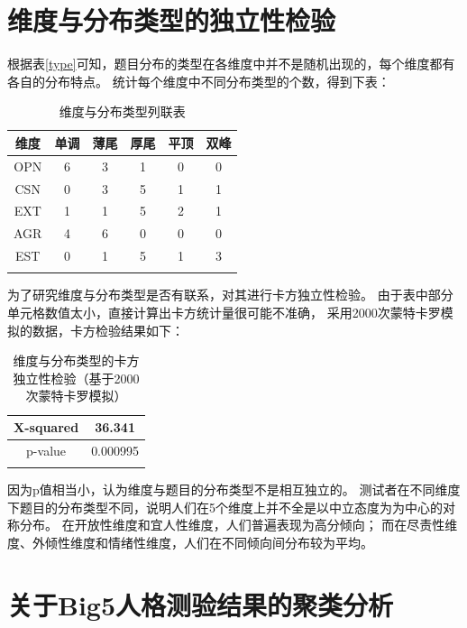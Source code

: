 \documentclass[UTF8]{ctexart}
\begin{document}
\part{维度与分布类型的独立性检验}
根据表\ref{type}可知，题目分布的类型在各维度中并不是随机出现的，每个维度都有各自的分布特点。
统计每个维度中不同分布类型的个数，得到下表：
\begin{longtable}{c|c|c|c|c|c}
  \hline
  维度  & 单调 & 薄尾 & 厚尾 & 平顶 & 双峰 \\\hline
  OPN & 6  & 3  & 1  & 0  & 0  \\
  CSN & 0  & 3  & 5  & 1  & 1  \\
  EXT & 1  & 1  & 5  & 2  & 1  \\
  AGR & 4  & 6  & 0  & 0  & 0  \\
  EST & 0  & 1  & 5  & 1  & 3  \\\hline
  \caption{维度与分布类型列联表}
\end{longtable}
为了研究维度与分布类型是否有联系，对其进行卡方独立性检验。
由于表中部分单元格数值太小，直接计算出卡方统计量很可能不准确，
采用2000次蒙特卡罗模拟的数据，卡方检验结果如下：
\begin{longtable}{c|c}
  \hline
  X-squared & 36.341   \\\hline
  p-value   & 0.000995 \\\hline
  \caption{维度与分布类型的卡方独立性检验（基于2000次蒙特卡罗模拟）}
\end{longtable}
因为p值相当小，认为维度与题目的分布类型不是相互独立的。
测试者在不同维度下题目的分布类型不同，说明人们在5个维度上并不全是以中立态度为为中心的对称分布。
在开放性维度和宜人性维度，人们普遍表现为高分倾向；
而在尽责性维度、外倾性维度和情绪性维度，人们在不同倾向间分布较为平均。
\part{关于Big5人格测验结果的聚类分析}
\setcounter{section}{0}
\end{document}
